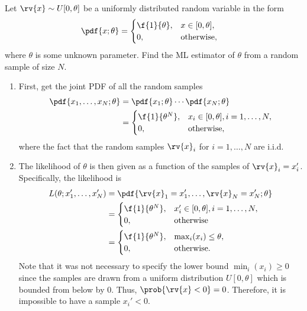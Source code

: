 \begin{example}
    Let $\rv{x}\sim U[0,\theta]$ be a uniformly distributed random variable in the form
    \begin{align}
        \pdf{x; \theta} &= 
        \begin{cases}
            \f{1}{\theta}, &x\in[0,\theta],\\
            0,&\text{otherwise},
        \end{cases}
    \end{align}
    where $\theta$ is some unknown parameter. Find the ML estimator of $\theta$ from a random sample of size $N$.

    \begin{enumerate}
        \item First, get the joint PDF of all the random samples
        \begin{align}
            \pdf{x_{1}, \ldots, x_{N}; \theta} &= \pdf{x_{1};\theta}\cdots\pdf{x_{N}; \theta}\\
            &= 
            \begin{cases}
                \f{1}{\theta^{N}}, &x_{i}\in[0, \theta], i=1,\ldots,N,\\
                0, &\text{otherwise},
            \end{cases}
        \end{align}
        where the fact that the random samples $\rv{x}_{i}$ for $i=1,\ldots,N$ are i.i.d. 

        \item The likelihood of $\theta$ is then given as a function of the samples of $\rv{x}_{i}=x_{i}'$. Specifically, the likelihood is
        \begin{align}
            L(\theta; x_{1}', \ldots, x_{N}') &=
            \pdf{\rv{x}_{1} = x_{1}', \ldots, \rv{x}_{N} = x_{N}'; \theta}\\
            &=
            \begin{cases}
                \f{1}{\theta^{N}}, &x_{i}'\in[0,\theta], i=1,\ldots, N, \\
                0, &\text{otherwise}
            \end{cases}\\
            &=
            \begin{cases}
                \label{eq:example ML uniform distribution}
                \f{1}{\theta^{N}}, &\max_{i}(x_{i})\leq\theta, \\
                0, &\text{otherwise}.
            \end{cases}
        \end{align}
        Note that it was not necessary to specify the lower bound $\min_{i}(x_{i})\geq 0$ since the samples are drawn from a uniform distribution $U[0, \theta]$ which is bounded from below by $0$. Thus, $\prob{\rv{x}<0} = 0$. Therefore, it is impossible to have a sample $x_{i}'<0$.


\end{enumerate}
\end{example}
